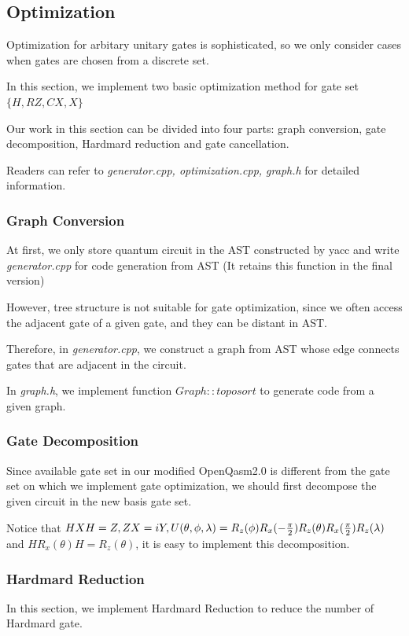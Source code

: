 \subsection{Optimization}

Optimization for arbitary unitary gates is sophisticated, so we only consider cases when gates are chosen from a discrete set.

In this section, we implement two basic optimization method for gate set $\{H, RZ, CX, X\}$

Our work in this section can be divided into four parts: graph conversion, gate decomposition, Hardmard reduction and gate cancellation.

Readers can refer to \textit{generator.cpp, optimization.cpp, graph.h} for detailed information.
\subsubsection{Graph Conversion}

At first, we only store quantum circuit in the AST constructed by yacc and write \textit{generator.cpp} for code generation from AST (It retains this function in the final version)

However, tree structure is not suitable for gate optimization, since we often access the adjacent gate of a given gate, and they can be distant in AST.

Therefore, in \textit{generator.cpp}, we construct a graph from AST whose edge connects gates that are adjacent in the circuit.

In \textit{graph.h}, we implement function $Graph::toposort$ to generate code from a given graph.

\subsubsection{Gate Decomposition}
Since available gate set in our modified OpenQasm2.0 is different from the gate set on which we implement gate optimization, we should first decompose the given circuit in the new basis gate set.

Notice that $HXH = Z, ZX = iY, U(\theta, \phi, \lambda) = R_z(\phi)R_x(-\frac{\pi}{2})R_z(\theta)R_x(\frac{\pi}{2})R_z(\lambda)\\$ and $HR_x(\theta)H = R_z(\theta)$, it is easy to implement this decomposition.

    \subsubsection{Hardmard Reduction}
    In this section, we implement Hardmard Reduction to reduce the number of Hardmard gate.

